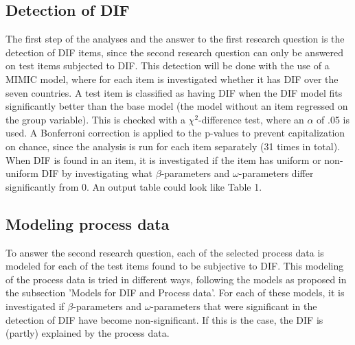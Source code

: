 \documentclass{article}
\begin{document}
\subsection*{Detection of DIF}
The first step of the analyses and the answer to the first research question is the detection of DIF items, since the second research question can only be answered on test items subjected to DIF. This detection will be done with the use of a MIMIC model, where for each item is investigated whether it has DIF over the seven countries. A test item is classified as having DIF when the DIF model fits significantly better than the base model (the model without an item regressed on the group variable). This is checked with a $\chi^2$-difference test, where an $\alpha$ of .05 is used. A Bonferroni correction is applied to the p-values to prevent capitalization on chance, since the analysis is run for each item separately (31 times in total). When DIF is found in an item, it is investigated if the item has uniform or non-uniform DIF by investigating what $\beta$-parameters and $\omega$-parameters differ significantly from 0. An output table could look like Table 1.

\subsection*{Modeling process data}
To answer the second research question, each of the selected process data is modeled for each of the test items found to be subjective to DIF. This modeling of the process data is tried in different ways, following the models as proposed in the subsection 'Models for DIF and Process data'. For each of these models, it is investigated if $\beta$-parameters and $\omega$-parameters that were significant in the detection of DIF have become non-significant. If this is the case, the DIF is (partly) explained by the process data. 
\end{document}
